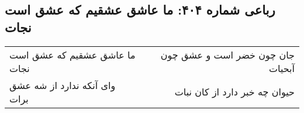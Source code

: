 \begin{center}
\section*{رباعی شماره ۴۰۴: ما عاشق عشقیم که عشق است نجات}
\label{sec:0404}
\begin{longtable}{l p{0.5cm} r}
ما عاشق عشقیم که عشق است نجات
&&
جان چون خضر است و عشق چون آبحیات
\\
وای آنکه ندارد از شه عشق برات
&&
حیوان چه خبر دارد از کان نبات
\\
\end{longtable}
\end{center}
